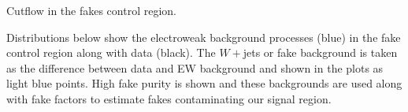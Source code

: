 \begin{table}[h!]
\scalebox{0.6}{

}
\caption{Cutflow in the fakes control region.}
\label{tab:fakescr}
\end{table}

Distributions below show the electroweak background processes (blue) in the fake control region along with data (black). The $W+$jets or fake background is taken as the difference between data and EW background and shown in the plots as light blue points. High fake purity is shown and these backgrounds are used along with fake factors to estimate fakes contaminating our signal region.

\begin{figure}[!h]
  \hfill
  \hfill
  \hfill
\end{figure}
